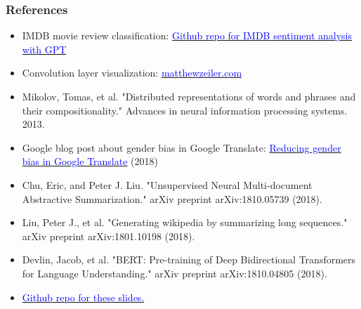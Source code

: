 \documentclass[9pt]{beamer}
\begin{document}
\begin{frame}
  \frametitle{References}

  \fontsize{6pt}{7.2}\selectfont

  \begin{itemize}
  \item IMDB movie review classification: \href{https://github.com/rodgzilla/pytorch-openai-transformer-lm/tree/movie_reviews_classification}{\textcolor{blue}{Github repo for IMDB sentiment analysis with GPT}}

  \item Convolution layer visualization: \href{https://www.matthewzeiler.com/research.html}{\textcolor{blue}{matthewzeiler.com}}

  \item Mikolov, Tomas, et al. "Distributed representations of words
    and phrases and their compositionality." Advances in neural
    information processing systems. 2013.

  \item Google blog post about gender bias in Google Translate:
    \href{https://www.blog.google/products/translate/reducing-gender-bias-google-translate/}{\textcolor{blue}{Reducing gender bias in Google Translate}} (2018)

  \item Chu, Eric, and Peter J. Liu. "Unsupervised Neural
    Multi-document Abstractive Summarization." arXiv preprint
    arXiv:1810.05739 (2018).

  \item Liu, Peter J., et al. "Generating wikipedia by summarizing
    long sequences." arXiv preprint arXiv:1801.10198 (2018).

  \item Devlin, Jacob, et al. "BERT: Pre-training of Deep
    Bidirectional Transformers for Language Understanding." arXiv
    preprint arXiv:1810.04805 (2018).

    \bigskip

  \item \href{https://github.com/rodgzilla/talk-slides/tree/master/machine_learning/general_focus_NLP}{\textcolor{blue}{Github repo for these slides.}}
  \end{itemize}
\end{frame}

\appendix
\end{document}

